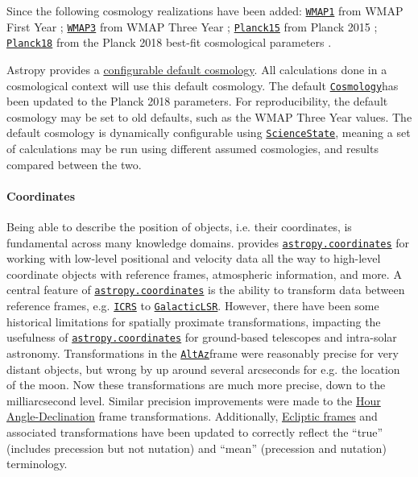 \documentclass[modern]{aastex631}
\newcommand{\astropysubpkg}[1]{\href{http://docs.astropy.org/en/stable/#1/index.html}{\texttt{astropy.#1}}\xspace}
\newcommand{\astropycoordinates}{\astropysubpkg{coordinates}}
\newcommand{\astropyapi}[2]{\href{https://docs.astropy.org/en/stable/api/astropy.#1.html}{#2}}
\newcommand{\astropyapidoc}[2]{\astropyapi{#1}{\texttt{#2}\xspace}}
\newcommand{\astropyICRS}{\astropyapidoc{coordinates.builtin_frames.ICRS}{ICRS}}
\newcommand{\astropyGalacticLSR}{\astropyapidoc{coordinates.builtin_frames.
GalacticLSR}{GalacticLSR}}
\newcommand{\astropyAltAz}{\astropyapidoc{coordinates.builtin_frames.AltAz}{AltAz}}
\newcommand{\astropyCosmology}{\astropyapidoc{cosmology.Cosmology}{Cosmology}}
\newcommand{\astropyScienceState}{\astropyapidoc{utils.state.ScienceState}{ScienceState}}
\begin{document}
    Since \citealt{astropy:2018} the following cosmology realizations have been
    added:
    \href{http://docs.astropy.org/en/stable/api/astropy.cosmology.WMAP1.html}{\texttt{WMAP1}}
    from WMAP First Year \citep[Table 7: WMAP + CBI + ACBAR + 2dFGRS +
    Lya]{WMAP1Year:2003};
    \href{http://docs.astropy.org/en/stable/api/astropy.cosmology.WMAP3.html}{\texttt{WMAP3}}
    from WMAP Three Year \citep[Table 6: WMAP + SNGold]{WMAP3Year:2007};
    \href{http://docs.astropy.org/en/stable/api/astropy.cosmology.Planck15.html}{\texttt{Planck15}}
    from Planck 2015 \citep[Table 4: TT, TE, EE + lowP + lensing +
    ext]{Planck2015XIII:2016};
    \href{http://docs.astropy.org/en/stable/api/astropy.cosmology.Planck18.html}{\texttt{Planck18}}
    from the Planck 2018 best-fit cosmological parameters \citep[Table 2: TT, TE,
    EE + lowE + lensing + BAO]{Planck2018VI:2020}.

    Astropy provides a
    \href{http://docs.astropy.org/en/stable/api/astropy.cosmology.default_cosmology.html}{configurable
    default cosmology}. All calculations done in a cosmological context will use
    this default cosmology. The default \astropyCosmology has been updated to the
    Planck 2018 parameters. For reproducibility, the default cosmology may be set
    to old defaults, such as the WMAP Three Year values. The default cosmology is
    dynamically configurable using \astropyScienceState, meaning a set of
    calculations may be run using different assumed cosmologies, and results
    compared between the two.

  \paragraph{Coordinates}

    Being able to describe the position of objects, i.e. their coordinates, is
    fundamental across many knowledge domains. \astropypkg provides
    \astropycoordinates for working with low-level positional and velocity data
    all the way to high-level coordinate objects with reference frames,
    atmospheric information, and more. A central feature of \astropycoordinates is
    the ability to transform data between reference frames, e.g. \astropyICRS
    \citep{ICRS:1997} to \astropyGalacticLSR \citep{GalacticLSR:2010}. However,
    there have been some historical limitations for spatially proximate
    transformations, impacting the usefulness of \astropycoordinates for
    ground-based telescopes and intra-solar astronomy. Transformations in the
    \astropyAltAz frame were reasonably precise for very distant objects, but
    wrong by up around several arcseconds for e.g. the location of the moon. Now
    these transformations are much more precise, down to the milliarcsecond
    level. Similar precision improvements were made to the
    \astropyapi{coordinates.builtin_frames.HADec}{Hour Angle-Declination} frame
    transformations. Additionally,
    \astropyapi{coordinates.builtin_frames.BaseEclipticFrame}{Ecliptic frames}
    and associated transformations have been updated to correctly reflect the
    “true” (includes precession but not nutation) and “mean” (precession and
    nutation) terminology.
\end{document}
